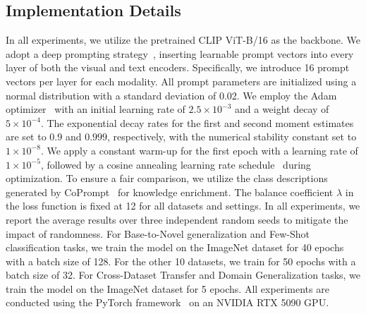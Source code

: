 \documentclass{article}
\theoremstyle{plain}
\theoremstyle{definition}
\theoremstyle{remark}
\begin{document}
	\subsection{Implementation Details}
	In all experiments, we utilize the pretrained CLIP ViT-B/16 as the backbone. We adopt a deep prompting strategy~\citep{jia2022vpt}, inserting learnable prompt vectors into every layer of both the visual and text encoders. Specifically, we introduce 16 prompt vectors per layer for each modality. All prompt parameters are initialized using a normal distribution with a standard deviation of 0.02. We employ the Adam optimizer~\citep{kingma2015adam} with an initial learning rate of $2.5\times 10^{-3}$ and a weight decay of $5\times 10^{-4}$. The exponential decay rates for the first and second moment estimates are set to $0.9$ and $0.999$, respectively, with the numerical stability constant set to $1\times 10^{-8}$. We apply a constant warm-up for the first epoch with a learning rate of $1\times 10^{-5}$, followed by a cosine annealing learning rate schedule~\citep{loshchilov2017sgdr} during optimization. To ensure a fair comparison, we utilize the class descriptions generated by CoPrompt~\citep{zhang2023coprompt} for knowledge enrichment. The balance coefficient $\lambda$ in the loss function is fixed at 12 for all datasets and settings. In all experiments, we report the average results over three independent random seeds to mitigate the impact of randomness. For Base-to-Novel generalization and Few-Shot classification tasks, we train the model on the ImageNet dataset for 40 epochs with a batch size of 128. For the other 10 datasets, we train for 50 epochs with a batch size of 32. For Cross-Dataset Transfer and Domain Generalization tasks, we train the model on the ImageNet dataset for 5 epochs. All experiments are conducted using the PyTorch framework~\citep{paszke2019pytorch} on an NVIDIA RTX 5090 GPU.
\end{document}
